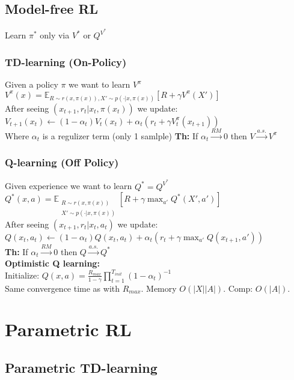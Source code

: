 \subsection{Model-free RL}
Learn $\pi^*$ only via $V^*$ or $Q^{V^*}$

\subsubsection{TD-learning (On-Policy)}
Given a policy $\pi$ we want to learn $V^\pi$\\
$V^\pi(x)=\mathbb{E}_{R\sim r(x,\pi(x)), X'\sim p(\cdot\vert x, \pi(x))}\left[R + \gamma V^\pi(X')\right]$\\
After seeing $(x_{t+1}, r_t \vert x_t, \pi(x_t))$ we update: \\
$V_{t+1}(x_t)\gets (1-\alpha_t)V_{t}(x_t) + \alpha_t(r_t + \gamma V_t^\pi(x_{t+1}))$\\
Where $\alpha_t$ is a regulizer term (only 1 samlple)
\textbf{Th:} If $\alpha_t\xrightarrow{RM}0$ then $V\xrightarrow{a.s.}V^\pi$

\subsubsection{Q-learning (Off Policy)}
Given experience we want to learn $Q^* = Q^{V^*}$\\
$Q^*(x,a) = \mathbb{E}_{\substack{R\sim r(x,\pi(x)) \\ X'\sim p(\cdot\vert x, \pi(x))}}\left[R+\gamma \max_{a'} Q^*(X',a')\right]$\\
After seeing $(x_{t+1}, r_t \vert x_t, a_t)$ we update: \\
$Q(x_t,a_t) ${\scriptsize $\gets (1-\alpha_t)Q(x_t,a_t) + \alpha_t(r_t+\gamma \max_{a'}Q(x_{t+1}, a'))$}\\
\textbf{Th:} If $\alpha_t\xrightarrow{RM}0$ then $Q\xrightarrow{a.s.}Q^{*}$\\
\textbf{Optimistic Q learning:}\\
Initialize: $Q(x,a)=\frac{R_{max}}{1-\gamma}\prod_{t=1}^{T_{init}}(1-\alpha_t)^{-1}$\\
Same convergence time as with $R_{max}$. Memory $O(|X||A|)$. Comp: $O(|A|)$.

\section{Parametric RL}
\subsection{Parametric TD-learning}
